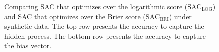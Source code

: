 \documentclass[aoas, preprint]{imsart}
\numberwithin{equation}{section}
\theoremstyle{plain}
\begin{document}
\begin{figure}[h!]


\caption[Optional caption for list of figures]{Comparing SAC that optimizes over the logarithmic score ($\text{SAC}_{\text{LOG}}$) and SAC that optimizes over the Brier score ($\text{SAC}_{\text{BRI}}$) under synthetic data. The top row presents the accuracy to capture the hidden process. The bottom row presents the accuracy to capture the bias vector. }
\label{Synthetic}
\end{figure}
\end{document}
